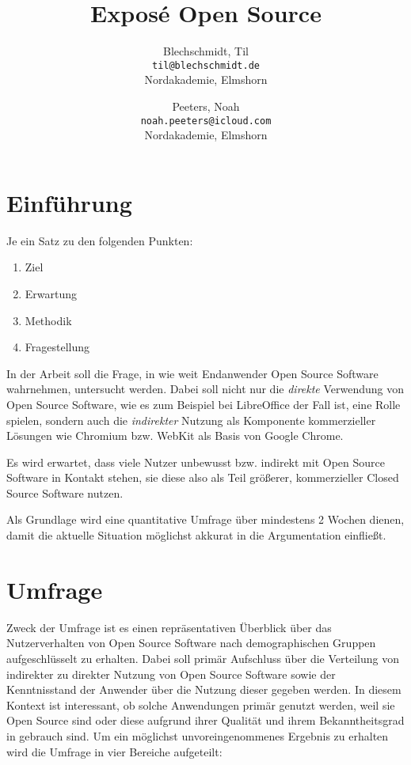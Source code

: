 \documentclass[a4paper]{article}
\title{Exposé Open Source}
\author{
  Blechschmidt, Til\\
  \texttt{til@blechschmidt.de}\\
  Nordakademie, Elmshorn
  \and
  Peeters, Noah\\
  \texttt{noah.peeters@icloud.com}\\
  Nordakademie, Elmshorn
}
\begin{document}
	\maketitle
	
	\section{Einführung}
		Je ein Satz zu den folgenden Punkten:
		\begin{enumerate}
		   \item Ziel
		   \item Erwartung
		   \item Methodik
		   \item Fragestellung
		\end{enumerate}
		
		In der Arbeit soll die Frage, in wie weit Endanwender Open Source Software wahrnehmen, untersucht werden. Dabei soll nicht nur die \emph{direkte} Verwendung von Open Source Software, wie es zum Beispiel bei LibreOffice der Fall ist, eine Rolle spielen, sondern auch die \emph{indirekter} Nutzung als Komponente kommerzieller Lösungen wie Chromium bzw. WebKit als Basis von Google Chrome.
		
		Es wird erwartet, dass viele Nutzer unbewusst bzw. indirekt mit Open Source Software in Kontakt stehen, sie diese also als Teil größerer, kommerzieller Closed Source Software nutzen.
		
		Als Grundlage wird eine quantitative Umfrage über mindestens 2 Wochen dienen, damit die aktuelle Situation möglichst akkurat in die Argumentation einfließt.
	
	\section{Umfrage}
		Zweck der Umfrage ist es einen repräsentativen Überblick über das Nutzerverhalten von Open Source Software nach demographischen Gruppen aufgeschlüsselt zu erhalten. Dabei soll primär Aufschluss über die Verteilung von indirekter zu direkter Nutzung von Open Source Software sowie der Kenntnisstand der Anwender über die Nutzung dieser gegeben werden. In diesem Kontext ist interessant, ob solche Anwendungen primär genutzt werden, weil sie Open Source sind oder diese aufgrund ihrer Qualität und ihrem Bekanntheitsgrad in gebrauch sind.
		Um ein möglichst unvoreingenommenes Ergebnis zu erhalten wird die Umfrage in vier Bereiche aufgeteilt:
	   
\end{document}
